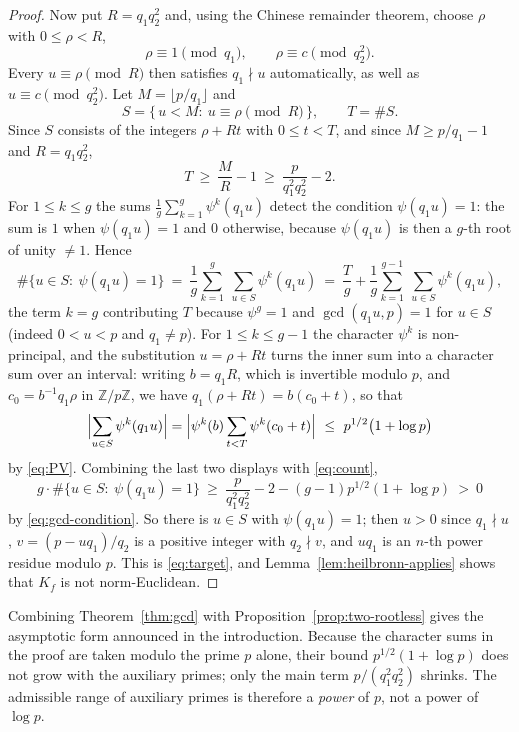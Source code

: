 \documentclass[11pt,reqno]{amsart}
\theoremstyle{plain}
\theoremstyle{definition}
\theoremstyle{remark}
\newcommand{\Z}{\mathbb{Z}}
\begin{document}
\begin{proof}
Now put $R=q_1q_2^{2}$ and, using the Chinese remainder theorem, choose $\rho$ with $0\le\rho<R$,
\[
  \rho\equiv1 \pmod{q_1},\qquad \rho\equiv c \pmod{q_2^{2}} .
\]
Every $u\equiv\rho\pmod R$ then satisfies $q_1\nmid u$ automatically, as well as
$u\equiv c\pmod{q_2^2}$. Let $M=\lfloor p/q_1\rfloor$ and
\[
  S=\{\,u<M:\ u\equiv\rho \pmod R\,\},\qquad T=\#S .
\]
Since $S$ consists of the integers $\rho+Rt$ with $0\le t<T$, and since $M\ge p/q_1-1$ and
$R=q_1q_2^{2}$,
\begin{equation}\label{eq:count}
  T\ \ge\ \frac MR-1\ \ge\ \frac{p}{q_1^{2}q_2^{2}}-2 .
\end{equation}
For $1\le k\le g$ the sums $\frac1g\sum_{k=1}^{g}\psi^{k}(q_1u)$ detect the condition
$\psi(q_1u)=1$: the sum is $1$ when $\psi(q_1u)=1$ and $0$ otherwise, because $\psi(q_1u)$ is then
a $g$-th root of unity $\ne1$. Hence
\[
  \#\{u\in S:\ \psi(q_1u)=1\}\ =\ \frac1g\sum_{k=1}^{g}\ \sum_{u\in S}\psi^{k}(q_1u)
  \ =\ \frac{T}g+\frac1g\sum_{k=1}^{g-1}\ \sum_{u\in S}\psi^{k}(q_1u),
\]
the term $k=g$ contributing $T$ because $\psi^{g}=1$ and $\gcd(q_1u,p)=1$ for $u\in S$
(indeed $0<u<p$ and $q_1\ne p$). For $1\le k\le g-1$ the character $\psi^{k}$ is non-principal,
and the substitution $u=\rho+Rt$ turns the inner sum into a character sum over an interval:
writing $b=q_1R$, which is invertible modulo $p$, and $c_0=b^{-1}q_1\rho$ in $\Z/p\Z$, we have
$q_1(\rho+Rt)=b(c_0+t)$, so that
\[
  \Bigl|\sum_{u\in S}\psi^{k}(q_1u)\Bigr|
  =\Bigl|\psi^{k}(b)\sum_{t<T}\psi^{k}(c_0+t)\Bigr|
  \ \le\ p^{1/2}\bigl(1+\log p\bigr)
\]
by \eqref{eq:PV}. Combining the last two displays with \eqref{eq:count},
\[
  g\cdot\#\{u\in S:\ \psi(q_1u)=1\}\ \ge\ \frac{p}{q_1^{2}q_2^{2}}-2-(g-1)p^{1/2}(1+\log p)\ >\ 0
\]
by \eqref{eq:gcd-condition}. So there is $u\in S$ with $\psi(q_1u)=1$; then $u>0$ since $q_1\nmid
u$, $v=(p-uq_1)/q_2$ is a positive integer with $q_2\nmid v$, and $uq_1$ is an $n$-th power
residue modulo $p$. This is \eqref{eq:target}, and Lemma~\ref{lem:heilbronn-applies} shows that
$K_f$ is not norm-Euclidean.
\end{proof}

Combining Theorem~\ref{thm:gcd} with Proposition~\ref{prop:two-rootless} gives the asymptotic form
announced in the introduction. Because the character sums in the proof are taken modulo the prime
$p$ alone, their bound $p^{1/2}(1+\log p)$ does not grow with the auxiliary primes; only the main
term $p/(q_1^2q_2^2)$ shrinks. The admissible range of auxiliary primes is therefore a
\emph{power} of $p$, not a power of $\log p$.
\end{document}

